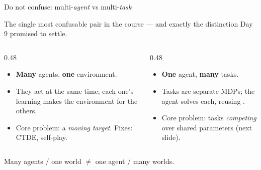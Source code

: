 \begin{frame}{Do not confuse: multi-\emph{agent} vs multi-\emph{task}}
\begin{center}\footnotesize
The single most confusable pair in the course --- and exactly the distinction Day 9
promised to settle.
\end{center}
\vspace{0.4em}
\begin{columns}[t]
\begin{column}{0.48\textwidth}
\begin{tcolorbox}[colback=boxred!30, colframe=accentred, title=\textbf{Multi-agent RL} \;(Day 9)]
\footnotesize
\begin{itemize}\itemsep0.3em
    \item \textbf{Many} agents, \textbf{one} environment.
    \item They act at the same time; each one's learning makes the environment
           for the others.
    \item Core problem: a \emph{moving target}. Fixes: CTDE, self-play.
\end{itemize}
\end{tcolorbox}
\end{column}
\begin{column}{0.48\textwidth}
\begin{tcolorbox}[colback=mlgreen!25, colframe=mlgreen!60!black, title=\textbf{Multi-task RL} \;(today)]
\footnotesize
\begin{itemize}\itemsep0.3em
    \item \textbf{One} agent, \textbf{many} tasks.
    \item Tasks are separate MDPs; the agent solves each, reusing
          .
    \item Core problem: tasks \emph{competing} over shared parameters (next slide).
\end{itemize}
\end{tcolorbox}
\end{column}
\end{columns}
\vfill
\begin{center}\footnotesize
Many agents / one world \; $\neq$ \; one agent / many worlds.
\end{center}
\end{frame}

